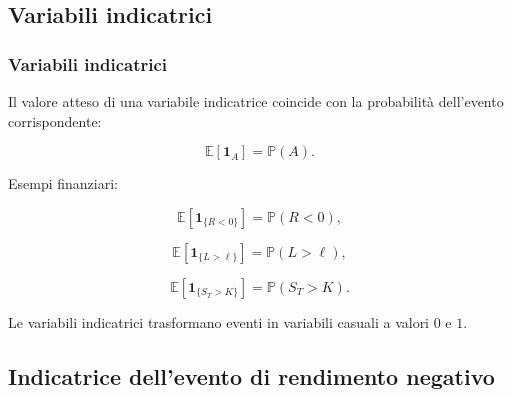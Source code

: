 \documentclass[handout]{beamer}%
\providecommand{\E}{\mathbb{E}}
\providecommand{\Prob}{\mathbb{P}}
\providecommand{\1}{\mathbf{1}}
\providecommand{\QTR}[2]{\csname #1\endcsname{#2}}
\begin{document}
\subsection{Variabili indicatrici}%

\begin{frame}%
%

\frametitle{Variabili indicatrici}%


Il valore atteso di una variabile indicatrice coincide con la probabilit\`{a}
dell'evento corrispondente:%

\[
\E[\1_A] = \Prob(A).
\]


\medskip

Esempi finanziari:%

\[
\E[\1_{\{R<0\}}] = \Prob(R<0),
\]
%

\[
\E[\1_{\{L>\ell\}}] = \Prob(L>\ell),
\]
%

\[
\E[\1_{\{S_T>K\}}] = \Prob(S_{T}>K).
\]


\medskip

Le variabili indicatrici trasformano eventi in variabili casuali a valori $0$
e $1$.%

\transboxout
\end{frame}%




\subsection{Indicatrice dell'evento di rendimento negativo}%
\end{document}
